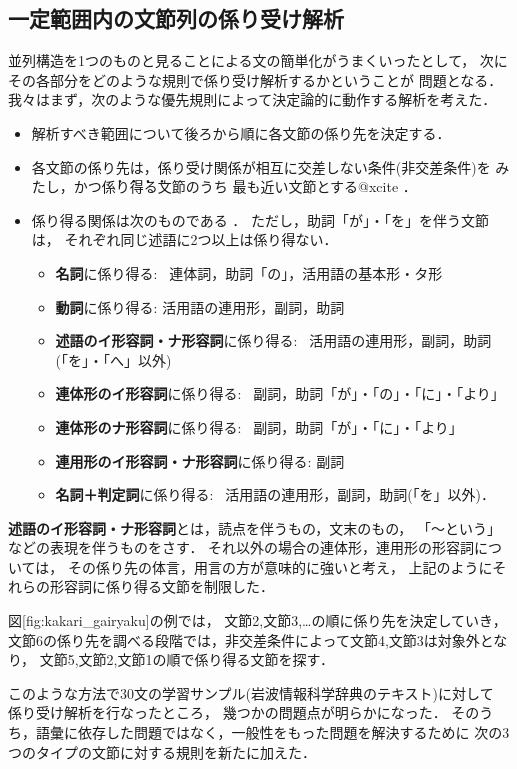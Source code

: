 \subsection{一定範囲内の文節列の係り受け解析}

並列構造を1つのものと見ることによる文の簡単化がうまくいったとして，
次にその各部分をどのような規則で係り受け解析するかということが
問題となる．
我々はまず，次のような優先規則によって決定論的に動作する解析を考えた．
\begin{itemize}
  \item 解析すべき範囲について後ろから順に各文節の係り先を決定する．
  \item 各文節の係り先は，係り受け関係が相互に交差しない条件(非交差条件)を
みたし，かつ\.{係}\.{り}\.{得}\.{る}文節のうち
最も近い文節とする@xcite
．
  \item 係り得る関係は次のものである
．
ただし，助詞「が」・「を」を伴う文節は，
それぞれ同じ述語に2つ以上は係り得ない．
\begin{itemize}
  \item 
{\bf 名詞}に係り得る: 
\ 連体詞，助詞「の」，活用語の基本形・タ形
  \item 
{\bf 動詞}に係り得る: 活用語の連用形，副詞，助詞
  \item 
{\bf 述語のイ形容詞・ナ形容詞}に係り得る: 
\ 活用語の連用形，副詞，助詞(「を」・「へ」以外)
  \item 
{\bf 連体形のイ形容詞}に係り得る: 
\ 副詞，助詞「が」・「の」・「に」・「より」
  \item 
{\bf 連体形のナ形容詞}に係り得る: 
\ 副詞，助詞「が」・「に」・「より」
  \item 
{\bf 連用形のイ形容詞・ナ形容詞}に係り得る: 副詞
  \item 
{\bf 名詞＋判定詞}に係り得る: 
\ 活用語の連用形，副詞，助詞(「を」以外)．
\end{itemize}
\end{itemize}
{\bf 述語のイ形容詞・ナ形容詞}とは，読点を伴うもの，文末のもの，
「〜という」などの表現を伴うものをさす．
それ以外の場合の連体形，連用形の形容詞については，
その係り先の体言，用言の方が意味的に強いと考え，
上記のようにそれらの形容詞に係り得る文節を制限した．

{\unitlength=1mm
}

図[fig:kakari_gairyaku]の例では，
文節2,文節3,\ldots の順に係り先を決定していき，
文節6の係り先を調べる段階では，非交差条件によって文節4,文節3は対象外となり，
文節5,文節2,文節1の順で係り得る文節を探す．

このような方法で30文の学習サンプル(岩波情報科学辞典のテキスト)に対して
係り受け解析を行なったところ，
幾つかの問題点が明らかになった．
そのうち，語彙に依存した問題ではなく，一般性をもった問題を解決するために
次の3つのタイプの文節に対する規則を新たに加えた．

